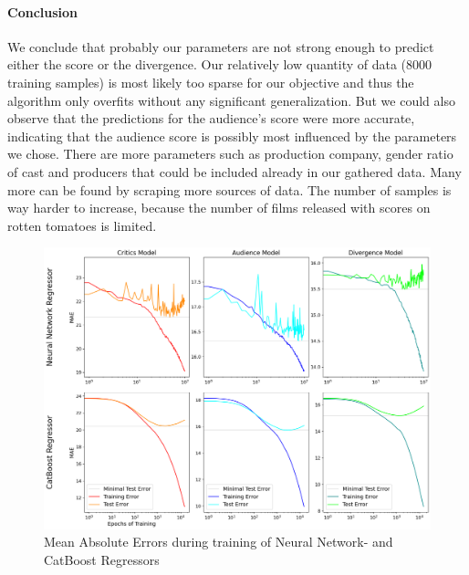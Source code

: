 \documentclass{article}
\begin{document}
    \paragraph{Conclusion}
    We conclude that probably our parameters are not strong enough to predict either the score or the divergence. Our relatively low quantity of data (8000 training samples) is most likely too sparse for our objective and thus the algorithm only overfits without any significant generalization. But we could also observe that the predictions for the audience's score were more accurate, indicating that the audience score is possibly most influenced by the parameters we chose. There are more parameters such as production company, gender ratio of cast and producers that could be included already in our gathered data. Many more can be found by scraping more sources of data. The number of samples is way harder to increase, because the number of films released with scores on rotten tomatoes is limited.
    \begin{figure}[tb]
        \centering
        \includegraphics[width=1\textwidth]{imgs/regression_errors.png}
        \caption{Mean Absolute Errors during training of Neural Network- and CatBoost Regressors}
        \label{fig:mae_errors}
    \end{figure}

\clearpage


\end{document}
